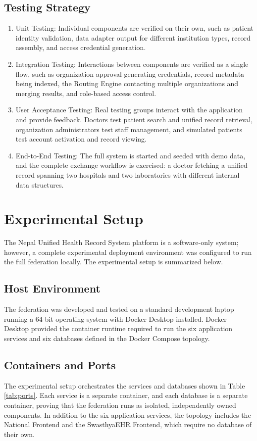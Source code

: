 \documentclass[12pt]{report}
\numberwithin{equation}{chapter}
\begin{document}
\section{Testing Strategy}
\begin{enumerate}
    \item Unit Testing: Individual components are verified on their own, such as patient identity validation, data adapter output for different institution types, record assembly, and access credential generation.
    \item Integration Testing: Interactions between components are verified as a single flow, such as organization approval generating credentials, record metadata being indexed, the Routing Engine contacting multiple organizations and merging results, and role-based access control.
    \item User Acceptance Testing: Real testing groups interact with the application and provide feedback. Doctors test patient search and unified record retrieval, organization administrators test staff management, and simulated patients test account activation and record viewing.
    \item End-to-End Testing: The full system is started and seeded with demo data, and the complete exchange workflow is exercised: a doctor fetching a unified record spanning two hospitals and two laboratories with different internal data structures.
\end{enumerate}

\chapter{Experimental Setup}
The Nepal Unified Health Record System platform is a software-only system; however, a complete experimental deployment environment was configured to run the full federation locally. The experimental setup is summarized below.

\section{Host Environment}
The federation was developed and tested on a standard development laptop running a 64-bit operating system with Docker Desktop installed. Docker Desktop provided the container runtime required to run the six application services and six databases defined in the Docker Compose topology.

\section{Containers and Ports}
The experimental setup orchestrates the services and databases shown in Table \ref{tab:ports}. Each service is a separate container, and each database is a separate container, proving that the federation runs as isolated, independently owned components. In addition to the six application services, the topology includes the National Frontend and the SwasthyaEHR Frontend, which require no database of their own.
\end{document}
